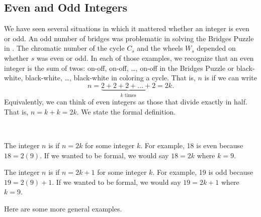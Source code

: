 
\newcommand{\subevenodd}{Even and Odd Integers}
\subsection{\subevenodd}
\label{sub_even_odd}

We have seen several situations in which it mattered whether an integer is even or odd.  An odd number of bridges was problematic in solving the Bridges Puzzle in .  The chromatic number of the cycle $C_s$ and the wheels $W_s$ depended on whether $s$ was even or odd.  In each of those examples, we recognize that an even integer is the sum of twos: on-off, on-off, \ldots, on-off in the Bridges Puzzle or black-white, black-white, \ldots, black-white in coloring a cycle.  That is, $n$ is  if we can write 
    $$n = \underbrace{2 + 2 + 2 + \ldots + 2}_{k \text{ times}} = 2k.$$
Equivalently, we can think of even integers as those that divide exactly in half.  That is, $n=k+k = 2k.$  We state the formal definition. 

\begin{defn}
\label{defn_even_odd}  
~
    \begin{apart}
        \item The integer $n$ is  if $n=2k$ for some integer $k$.  For example, 18 is even because $18=2(9)$. If we wanted to be formal, we would say $18=2k$ where $k=9$.
        \item The integer $n$ is  if $n=2k+1$ for some integer $k$.  For example, 19 is odd because $19 = 2(9)+1$. If we wanted to be formal, we would say $19=2k+1$ where $k=9$.
    \end{apart}
\end{defn}

Here are some more general examples.

